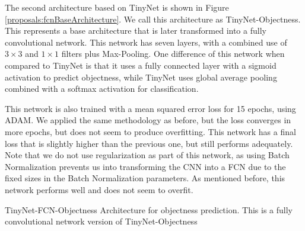 The second architecture based on TinyNet is shown in Figure \ref{proposals:fcnBaseArchitecture}. We call this architecture as TinyNet-Objectness. This represents a base architecture that is later transformed into a fully convolutional network. This network has seven layers, with a combined use of $3 \times 3$ and $1 \times 1$ filters plus Max-Pooling. One difference of this network when compared to TinyNet is that it uses a fully connected layer with a sigmoid activation to predict objectness, while TinyNet uses global average pooling combined with a softmax activation for classification. 

This network is also trained with a mean squared error loss for 15 epochs, using ADAM. We applied the same methodology as before, but the loss converges in more epochs, but does not seem to produce overfitting. This network has a final loss that is slightly higher than the previous one, but still performs adequately. Note that we do not use regularization as part of this network, as using Batch Normalization prevents us into transforming the CNN into a FCN due to the fixed sizes in the Batch Normalization parameters. As mentioned before, this network performs well and does not seem to overfit.

\begin{marginfigure}
    \centering
    \caption[TinyNet-FCN-Objectness Architecture for objectness prediction]{TinyNet-FCN-Objectness Architecture for objectness prediction. This is a fully convolutional network version of TinyNet-Objectness}
    \label{proposals:fcnArchitecture}
\end{marginfigure}

